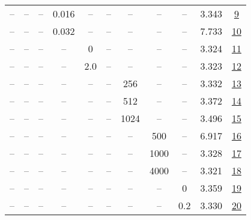 \begin{table}[H]
\begin{tabular}{ccccccccccc}
-- & -- & -- & 0.016 & -- & -- & -- & -- & -- & 3.343 & \href{https://wandb.ai/stanford-mercury/optimizer-scaling/runs/sweep-130m-10B-nadamwp178376lr0.016-wd0.1-minlr0-warmup2000-b10.-3dd959}{9} \\
-- & -- & -- & 0.032 & -- & -- & -- & -- & -- & 7.733 & \href{https://wandb.ai/stanford-mercury/optimizer-scaling/runs/sweep-130m-10B-nadamw7b7716lr0.032-wd0.1-minlr0-warmup2000-b10.9-f763f8}{10} \\
-- & -- & -- & -- & 0 & -- & -- & -- & -- & 3.324 & \href{https://wandb.ai/stanford-mercury/optimizer-scaling/runs/sweep-130m-10B-nadamw0bbe53lr0.008-wd0.1-minlr0-warmup2000-b10.9-b2ac71}{11} \\
-- & -- & -- & -- & 2.0 & -- & -- & -- & -- & 3.323 & \href{https://wandb.ai/stanford-mercury/optimizer-scaling/runs/sweep-130m-10B-nadamw4c5082lr0.008-wd0.1-minlr0-warmup2000-b10.9-cae222}{12} \\
-- & -- & -- & -- & -- & -- & 256 & -- & -- & 3.332 & \href{https://wandb.ai/stanford-mercury/optimizer-scaling/runs/sweep-130m-10B-nadamw1c5657lr0.008-wd0.1-minlr0-warmup2000-b10.9-24fa43}{13} \\
-- & -- & -- & -- & -- & -- & 512 & -- & -- & 3.372 & \href{https://wandb.ai/stanford-mercury/optimizer-scaling/runs/sweep-130m-10B-nadamw96aba0lr0.008-wd0.1-minlr0-warmup2000-b10.9-55301a}{14} \\
-- & -- & -- & -- & -- & -- & 1024 & -- & -- & 3.496 & \href{https://wandb.ai/stanford-mercury/optimizer-scaling/runs/sweep-130m-10B-nadamw83e5b9lr0.008-wd0.1-minlr0-warmup2000-b10.9-2282ab}{15} \\
-- & -- & -- & -- & -- & -- & -- & 500 & -- & 6.917 & \href{https://wandb.ai/stanford-mercury/optimizer-scaling/runs/sweep-130m-10B-nadamwfcce14lr0.008-wd0.1-minlr0-warmup500-b10.95-94b29c}{16} \\
-- & -- & -- & -- & -- & -- & -- & 1000 & -- & 3.328 & \href{https://wandb.ai/stanford-mercury/optimizer-scaling/runs/sweep-130m-10B-nadamw84a048lr0.008-wd0.1-minlr0-warmup1000-b10.9-6df1b8}{17} \\
-- & -- & -- & -- & -- & -- & -- & 4000 & -- & 3.321 & \href{https://wandb.ai/stanford-mercury/optimizer-scaling/runs/sweep-130m-10B-nadamwd3819dlr0.008-wd0.1-minlr0-warmup4000-b10.9-1ecddc}{18} \\
-- & -- & -- & -- & -- & -- & -- & -- & 0 & 3.359 & \href{https://wandb.ai/stanford-mercury/optimizer-scaling/runs/sweep-130m-10B-nadamwa93ecflr0.008-wd0-minlr0-warmup2000-b10.95--6cf200}{19} \\
-- & -- & -- & -- & -- & -- & -- & -- & 0.2 & 3.330 & \href{https://wandb.ai/stanford-mercury/optimizer-scaling/runs/sweep-130m-10B-nadamw3a2340lr0.008-wd0.2-minlr0-warmup2000-b10.9-c65ff6}{20} \\
\bottomrule
\end{tabular}
\end{table}

